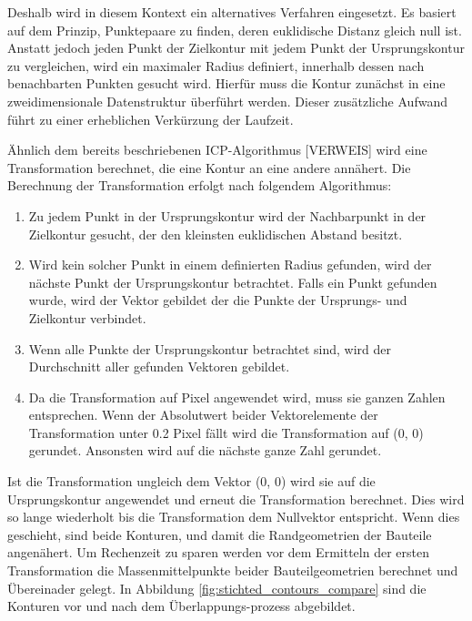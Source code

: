 Deshalb wird in diesem Kontext ein alternatives Verfahren eingesetzt. 
Es basiert auf dem Prinzip, Punktepaare zu finden, deren euklidische
Distanz gleich null ist. Anstatt jedoch jeden Punkt der Zielkontur mit 
jedem Punkt der Ursprungskontur zu vergleichen, wird ein maximaler Radius definiert, 
innerhalb dessen nach benachbarten Punkten gesucht wird. Hierfür muss die Kontur 
zunächst in eine zweidimensionale Datenstruktur überführt werden. Dieser zusätzliche 
Aufwand führt zu einer erheblichen Verkürzung der Laufzeit.

Ähnlich dem bereits beschriebenen ICP-Algorithmus [VERWEIS] wird eine Transformation 
berechnet, die eine Kontur an eine andere annähert. Die Berechnung der 
Transformation erfolgt nach folgendem Algorithmus:

\begin{enumerate}
    \item Zu jedem Punkt in der Ursprungskontur wird der Nachbarpunkt
    in der Zielkontur gesucht, der den kleinsten euklidischen Abstand besitzt.
    \item Wird kein solcher Punkt in einem definierten Radius gefunden,
    wird der nächste Punkt der Ursprungskontur
    betrachtet. Falls ein Punkt gefunden wurde, wird der Vektor gebildet der die Punkte
    der Ursprungs- und Zielkontur verbindet.
    \item Wenn alle Punkte der Ursprungskontur betrachtet sind, wird der 
    Durchschnitt aller gefunden Vektoren gebildet.
    \item Da die Transformation auf Pixel angewendet wird, muss sie ganzen Zahlen 
    entsprechen. Wenn der Absolutwert beider Vektorelemente der Transformation 
    unter 0.2 Pixel fällt wird die Transformation auf (0, 0) gerundet.
    Ansonsten wird auf die nächste ganze Zahl gerundet.
\end{enumerate}

Ist die Transformation ungleich dem Vektor (0, 0) wird sie auf die Ursprungskontur 
angewendet und erneut die Transformation berechnet. Dies wird so lange wiederholt bis 
die Transformation dem Nullvektor entspricht. Wenn dies geschieht, sind beide Konturen, 
und damit die Randgeometrien der Bauteile angenähert.
Um Rechenzeit zu sparen werden vor dem Ermitteln der ersten Transformation die 
Massenmittelpunkte beider Bauteilgeometrien berechnet und Übereinader gelegt.
In Abbildung \ref{fig:stichted_contours_compare} sind die Konturen vor und nach 
dem Überlappungs-prozess abgebildet.


